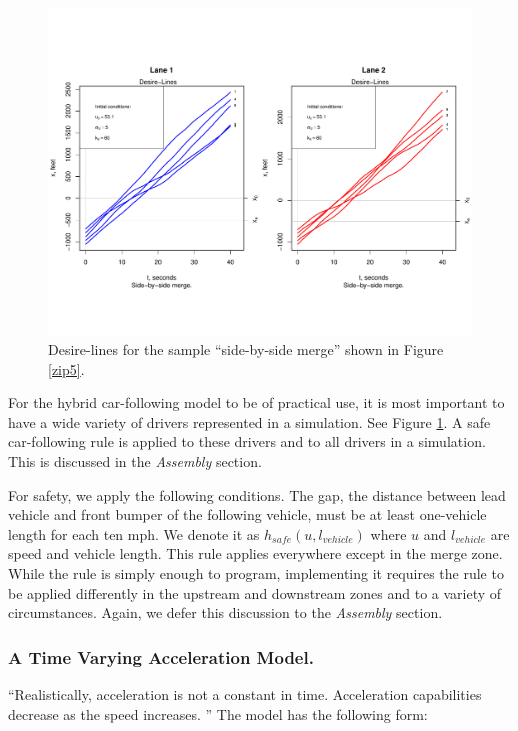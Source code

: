 \documentclass[Proceedings]{ascelike}
\begin{document}
\begin{figure}
\centering
\includegraphics[width = 5.5in]{Rplot10.pdf}
\caption{Desire-lines for the sample  ``side-by-side merge'' shown in Figure \ref{zip5}.}
\label{desire5}
\end{figure}



For the hybrid car-following model to be of practical use, it is  most important to have a wide variety of drivers represented in a simulation.  See Figure \ref{desire5}. A safe car-following rule is applied to these drivers and to all drivers in a simulation. This is discussed in the \emph{Assembly} section. 

For safety, we apply the following conditions. The gap, the distance between lead vehicle and front bumper of the following vehicle, must be at least one-vehicle length for each ten mph. We denote it as $h_{safe}(u, l_{vehicle})$ where $u$ and $l_{vehicle}$ are speed and vehicle length. This rule applies everywhere except in the  merge zone. While the rule is simply enough to program, implementing it requires the rule to be applied differently in the upstream and downstream zones and to a variety of circumstances. Again, we defer this discussion to the \emph{Assembly} section. 

\subsubsection{A Time Varying Acceleration Model.}

 ``Realistically, acceleration is not a constant in time. Acceleration capabilities decrease as the speed increases. \cite{LiliBook}''  The model has the following form:
\end{document}
